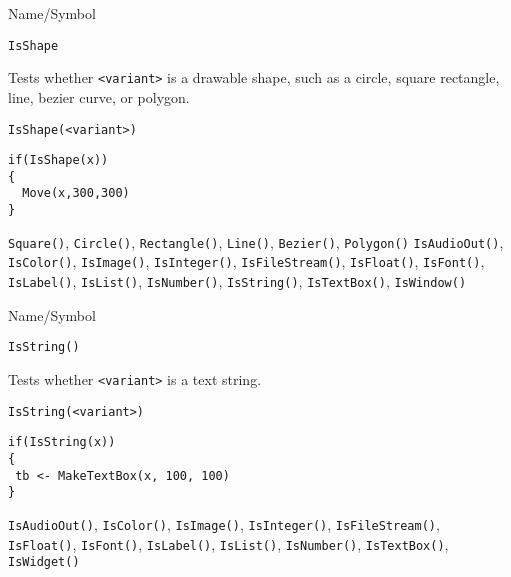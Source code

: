 \begin{desc}{Name/Symbol}
\item[Name/Symbol]	\verb+IsShape+

\item[Description]	Tests whether \verb+<variant>+ is a drawable
  shape, such as a circle, square rectangle, line, bezier curve, or
  polygon.


\item[Usage]		
\begin{verbatim}
IsShape(<variant>)
\end{verbatim}

\item[Example]	
\begin{verbatim}
if(IsShape(x))
{
  Move(x,300,300)
}
\end{verbatim}

\item[See Also]	\verb+Square()+, \verb+Circle()+,
  \verb+Rectangle()+, \verb+Line()+, \verb+Bezier()+, \verb+Polygon()+ 
 \verb+IsAudioOut()+, \verb+IsColor()+,
  \verb+IsImage()+, \verb+IsInteger()+, \verb+IsFileStream()+,
  \verb+IsFloat()+, \verb+IsFont()+, \verb+IsLabel()+,
  \verb+IsList()+, \verb+IsNumber()+, \verb+IsString()+,
  \verb+IsTextBox()+, \verb+IsWindow()+
\end{desc}

\rl


\begin{desc}{Name/Symbol}
\item[Name/Symbol]	\verb+IsString()+

\item[Description]	Tests whether \verb+<variant>+ is a text string.

\item[Usage]		
\begin{verbatim}
IsString(<variant>)
\end{verbatim}

\item[Example]	
\begin{verbatim}
if(IsString(x))
{
 tb <- MakeTextBox(x, 100, 100)
}
\end{verbatim}

\item[See Also]	\verb+IsAudioOut()+, \verb+IsColor()+, \verb+IsImage()+, \verb+IsInteger()+, 
		\verb+IsFileStream()+, \verb+IsFloat()+, \verb+IsFont()+, \verb+IsLabel()+,
		\verb+IsList()+, \verb+IsNumber()+, \verb+IsTextBox()+, \verb+IsWidget()+
\end{desc}

